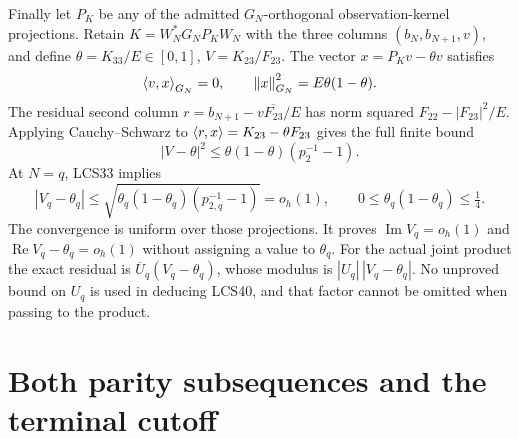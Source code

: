 \documentclass[11pt,a4paper]{article}
\providecommand{\Tr}{\operatorname{Tr}}
\providecommand{\PP}{\mathcal P}
\providecommand{\norm}[1]{\left\lVert#1\right\rVert}
\begin{document}
Finally let $P_K$ be any of the admitted $G_N$-orthogonal
observation-kernel projections. Retain
$K=W_N^*G_NP_KW_N$ with the three columns
$(b_N,b_{N+1},v)$, and define
$\theta=K_{33}/E\in[0,1]$, $V=K_{23}/F_{23}$.
The vector $x=P_Kv-\theta v$ satisfies
\[
 \ip v x_{G_N}=0,\qquad\norm x_{G_N}^2=E\theta(1-\theta).
\]
The residual second column
$r=b_{N+1}-v\overline{F_{23}}/E$ has norm squared
$F_{22}-|F_{23}|^2/E$. Applying Cauchy--Schwarz to
$\left\langle r,x\right\rangle=K_{23}-\theta F_{23}$ gives the full finite bound
\begin{equation}\tag{LCS39}
 \boxed{|V-\theta|^2\le\theta(1-\theta)(p_2^{-1}-1).}
\end{equation}
At $N=q$, LCS33 implies
\begin{equation}\tag{LCS40}
 |V_q-\theta_q|\le
 \sqrt{\theta_q(1-\theta_q)(p_{2,q}^{-1}-1)}=o_h(1),
 \qquad 0\le\theta_q(1-\theta_q)\le\tfrac14.
\end{equation}
The convergence is uniform over those projections. It proves
$\operatorname{Im}V_q=o_h(1)$ and
$\operatorname{Re}V_q-\theta_q=o_h(1)$ without assigning a value
to $\theta_q$. For the actual joint product the exact residual is
$\overline U_q(V_q-\theta_q)$, whose modulus is
$|U_q|\,|V_q-\theta_q|$. No unproved bound on $U_q$ is used in
deducing LCS40, and that factor cannot be omitted when passing
to the product.



\endgroup

\clearpage
\begingroup
\def\C{\mathbb C}
\def\R{\mathbb R}
\def\PP{\mathcal P}
\def\norm#1{\left\lVert#1\right\rVert}
\def\Tr{\operatorname{Tr}}

\setcounter{equation}{0}
\renewcommand{\theequation}{A04RBE.\arabic{equation}}
\section*{Both parity subsequences and the terminal cutoff}


\begin{abstract}
The two boundary projection energies in the original response ellipse
are evaluated through the full retained eigenclass, its consecutive
Cauchy transforms, and its actual source-norm drops. The eigen-equation
determines the complete opposite-parity masses. Their exact transport
between adjacent attained sections expresses each class-norm drop in
the original directed phase errors. Together with the original
arithmetic covariance and multiplication estimates, this proves
\(p_2=\Theta_h(a^2/q^2)\) on the even cutoff subsequence and
\(p_1=O_h(q^{-2})\) on the odd subsequence, with explicit finite
bounds and complete primary multiplicity retained. The same directed
error extends to the previously uncovered final receiving cutoff.
The observation-kernel projection remains its original map; none
of its individual projected signs is inferred from these energies.
\end{abstract}
\end{document}
